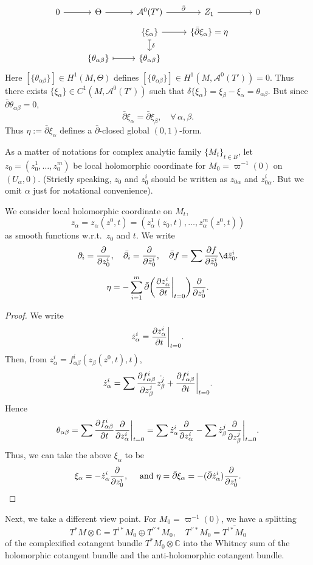 \documentclass[12pt]{article}
\begin{document}
\[\begin{tikzcd}[row sep=tiny]
	0 & \Theta & {\mathcal{A}^0(T')} & {Z_1} & 0 \\
	&& {\{\xi_\alpha\}} & {\{\bar{\partial}\xi_\alpha\}=\eta} \\
	\\
	\\
	& {\{\theta_{\alpha\beta}\}} & {\{\theta_{\alpha\beta}\}}
	\arrow[from=2-3, to=2-4]
	\arrow[from=1-2, to=1-3]
	\arrow[from=1-1, to=1-2]
	\arrow[from=1-4, to=1-5]
	\arrow["{\bar{\partial}}", from=1-3, to=1-4]
	\arrow["\delta", maps to, from=2-3, to=5-3]
	\arrow[maps to, from=5-2, to=5-3]
\end{tikzcd}\]
Here \([\{\theta_{\alpha\beta}\}]\in H^1(M,\Theta)\) defines \([\{\theta_{\alpha\beta}
\}]\in H^1(M,\mathcal{A}^0(T'))=0\). Thus there exists \(\{\xi_\alpha\}\in C^1(M,
\mathcal{A}^{0}(T'))\) such that \(\delta\{\xi_{\alpha}\}=\xi_\beta-\xi_\alpha=
\theta_{\alpha\beta}\). But since \(\bar{\partial}\theta_{\alpha\beta}=0\), \[
  \bar{\partial}\xi_\alpha=\bar{\partial}\xi_\beta,\quad \forall\,\alpha,\beta
.\] Thus \(\eta:=\bar{\partial}\xi_\alpha\) defines a \(\bar{\partial}\)-closed
global \((0,1)\)-form.

As a matter of notations for complex analytic family \(\{M_t\}_{t\in B}\), let
\(z_0=(z^1_0,\ldots,z^m_0)\) be local holomorphic coordinate for \(M_0=\varpi^{-1}(0)\)
on \((U_\alpha,0)\). (Strictly speaking, \(z_0\) and \(z^i_0\) should be written as 
\(z_{0\alpha}\) and \(z_{0\alpha}^i\). But we omit \(\alpha\) just for notational
convenience).

We consider local holomorphic coordinate on \(M_t\), \[
  z_\alpha=z_\alpha(z^0,t)=(z^1_\alpha(z_0,t),\ldots,z_\alpha^m(z^0,t))
\] as smooth functions w.r.t.\ \(z_0\) and \(t\). We write \[
  \partial_i=\pd{z^i_0},\quad \bar{\partial_i}=\pd{\bar{z}^i_0},\quad 
  \bar{\partial}f=\sum \pdv{f}{\bar{z}^i_0}\dd{\bar{z}^i_0}
.\] 
\begin{prop}\label{prop:30-1-1}
  \[
    \eta=-\sum_{i=1}^{m}\bar{\partial}\left(\pdv{z^i_\alpha}{t}\bigg|_{t=0}\right)
    \pd{z^i_0}
  .\] 
\end{prop}
\begin{proof}
  We write \[
    \dot{z}^i_\alpha=\pdv{z^i_\alpha}{t}\bigg|_{t=0}
  .\] Then, from \(z^i_\alpha=f_{\alpha\beta}^i(z_\beta(z^0,t),t)\), \[
    \dot{z}^i_\alpha=\sum \pdv{f_{\alpha\beta}^i}{z^j_\beta}\dot{z^j_\beta}
    +\pdv{f_{\alpha\beta}^i}{t}\bigg|_{t=0}
  .\] Hence \[
    \theta_{\alpha\beta}=\sum \pdv{f_{\alpha\beta}^i}{t}\pdv{}{z^i_\alpha}\bigg|_{t=0}
    =\sum\dot{z}^i_\alpha\pdv{}{z^i_\alpha}-\sum\dot{z}^j_\beta\pdv{}{z^j_\beta}\bigg|_{t=0}
  .\] Thus, we can take the above \(\xi_\alpha\) to be \[
    \xi_\alpha=-\dot{z}^i_\alpha\pdv{}{z^i_0},\quad
    \text{ and }\eta=\bar{\partial}\xi_\alpha=-(\bar{\partial}\dot{z}^i_\alpha)
    \pdv{}{z^i_0}
  .\]
\end{proof}
Next, we take a different view point. For \(M_0=\varpi^{-1}(0)\), we have a splitting
\[
  T^*M\otimes\mathbb{C}=T^{\prime*}M_0\oplus T^{\prime\prime*}M_0,\quad
  T^{\prime\prime*}M_0=\overline{T^{\prime*}M_0}
\] of the complexified cotangent bundle \(T^*M_0\otimes\mathbb{C}\) into the
Whitney sum of the holomorphic cotangent bundle and the anti-holomorphic cotangent
bundle.
\end{document}
